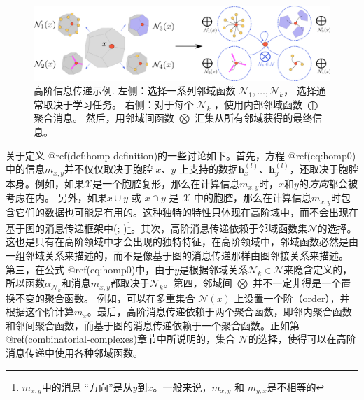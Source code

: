 \documentclass[
  12pt,
]{krantz}
\begin{document}
\begin{figure}

{\centering \includegraphics{figures/homp} 

}

\caption{高阶信息传递示例. 左侧：选择一系列邻域函数 $\mathcal{N}_1,\ldots,\mathcal{N}_k$， 选择通常取决于学习任务。 右侧：对于每个 $\mathcal{N}_k$ ，使用内部邻域函数 $\bigoplus$ 聚合消息。 然后，用邻域间函数 $\bigotimes$ 汇集从所有邻域获得的最终信息。}\label{fig:homp}
\end{figure}

关于定义 @ref(def:homp-definition)的一些讨论如下。首先，方程
@ref(eq:homp0)中的信息\(m_{x,y}\)并不仅仅取决于胞腔 \(x、y\)
上支持的数据\(\mathbf{h}_x^{(l)}\)、\(\mathbf{h}_y^{(l)}\)，还取决于胞腔本身。例如，如果\(\mathcal{X}\)是一个胞腔复形，那么在计算信息\(m_{x,y}\)时，\(x\)和\(y\)的\emph{方向}都会被考虑在内。
另外，如果\(x\cup y\) 或 \(x\cap y\) 是 \(\mathcal{X}\)
中的胞腔，那么在计算信息\(m_{x,y}\)时包含它们的数据也可能是有用的。这种独特的特性只体现在高阶域中，而不会出现在基于图的消息传递框架中(; )\footnote{\(m_{x,y}\)中的消息
  ``方向''是从\(y\)到\(x\)。一般来说，\(m_{x,y}\) 和
  \(m_{y,x}\)是不相等的}。其次，高阶消息传递依赖于邻域函数集\(\mathcal{N}\)的选择。这也是只有在高阶领域中才会出现的独特特征，在高阶领域中，邻域函数必然是由一组邻域关系来描述的，而不是像基于图的消息传递那样由图邻接关系来描述。
第三，在公式
@ref(eq:homp0)中，由于\(y\)是根据邻域关系\(\mathcal{N}_k \in\mathcal{N}\)来隐含定义的，所以函数\(\alpha_{\mathcal{N}_k}\)和消息\(m_{x,y}\)都取决于\(\mathcal{N}_k\)。第四，邻域间
\(\bigotimes\) 并不一定非得是一个置换不变的聚合函数。
例如，可以在多重集合 \(\mathcal{N}(x)\)
上设置一个阶（order），并根据这个阶计算\(m_x\)。最后，高阶消息传递依赖于两个聚合函数，即邻内聚合函数和邻间聚合函数，而基于图的消息传递依赖于一个聚合函数。正如第@ref(combinatorial-complexes)章节中所说明的，集合
\(\mathcal{N}\)的选择，使得可以在高阶消息传递中使用各种邻域函数。
\end{document}
